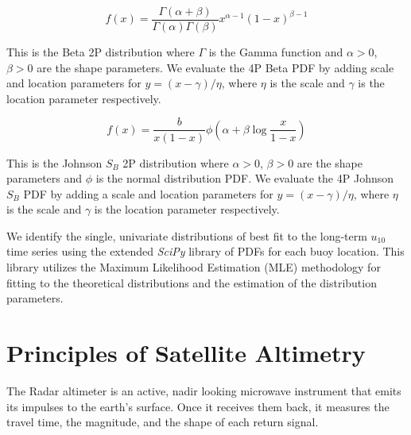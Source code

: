 \begin{equation}
f(x) = \frac{\Gamma\left(\alpha+\beta\right)}{\Gamma(\alpha)\Gamma(\beta)} x^{\alpha-1}(1-x)^{\beta-1}
\label{eqn:beta}
\end{equation}

This is the Beta 2P distribution where $\Gamma$ is the Gamma function and $\alpha > 0$, $\beta > 0$ are the shape parameters. We evaluate the 4P Beta PDF by adding scale and location parameters for $y = (x-\gamma)/\eta$, where $\eta$ is the scale and $\gamma$ is the location parameter respectively.


\begin{equation}
f(x) = \frac{b}{x(1-x)} \phi\left(\alpha+\beta\log{\frac{x}{1-x}}\right)
\label{eqn:johnsonsb}
\end{equation}


This is the Johnson $S_{B}$ 2P distribution where $\alpha > 0$, $\beta > 0$ are the shape parameters and $\phi$ is the normal distribution PDF. We evaluate the 4P Johnson $S_{B}$ PDF by adding a scale and location parameters for $y = (x-\gamma)/\eta$, where $\eta$ is the scale and $\gamma$ is the location parameter respectively.


We identify the single, univariate distributions of best fit to the long-term $u_{10}$ time series using the extended \emph{SciPy} library of PDFs for each buoy location. This library utilizes the Maximum Likelihood Estimation (MLE) methodology for fitting to the theoretical distributions and the estimation of the distribution parameters.





\section{Principles of Satellite Altimetry}\label{AltimetryPrinciples}

The Radar altimeter is an active, nadir looking microwave instrument that emits its impulses to the earth's surface. Once it receives them back, it measures the travel time, the magnitude, and the shape of each return signal.

